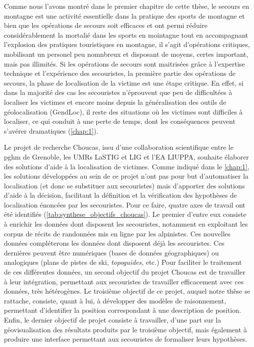 Comme nous l'avons montré dans le premier chapitre de cette thèse, le
secours en montagne est une activité essentielle dans la pratique des
sports de montagne et bien que les opérations de secours soit
efficaces et ont permi réduire considérablement la mortalié dans les
sports en mointagne tout en accompagnant l'explosion des pratiques
touristiques en montagne, il s'agit d'opérations critiques, mobilisant
un personel peu nomnbreux et disposant de moyens, certes important,
mais pas illimités. Si les opérations de secours sont maitrisées grâce
à l'expertise technique et l'expérience des secouristes,
%
la première partie des opérations de secours, \ie la phase de
localisation de la victime est une étape critique. En effet, si dans
la majorité des cas les secouristes n'éprouvent que peu de
difficultées à localiser les victimes et encore moins depuis la
généralisation des outils de géolocalisation (\eg GendLoc), il reste
des situations où les victimes sont difficiles à localiser, ce qui
conduit à une perte de temps, dont les conséquences peuvent s'avérer
dramatiques (\autoref{chap:1}).

Le projet de recherche Choucas, issu d'une collaboration scientifique
entre le \ac{pghm} de Grenoble, les UMRs LaSTIG et LIG et l'EA LIUPPA,
souhaite élaborer des solutions d'aide à la localisation de
victimes. Comme indiqué dans le \autoref{chap:1}, les solutions
développées au sein de ce projet n'ont pas pour but d'automatiser la
localisation (et donc se substituer aux secouristes) mais d'apporter
des solutions d'aide à la décision, facilitant la définition et la
vérification des hypothèses de localisation énoncées par les
secouristes. Pour ce faire, quatre axes de travail ont été identifiés
(\autoref{tab:synthese_objectifs_choucas}). Le premier d'entre eux
consiste à enrichir les données dont disposent les secouristes,
notamment en exploitant les corpus de récits de randonnées mis en
ligne par les alpinistes. Ces nouvelles données compléterons les
données dont disposent déjà les secouristes. Ces dernières peuvent
être numériques (\eg bases de données géographiques) ou analogiques
(\eg plans de pistes de ski, \emph{topoguides,} etc.)
%
Pour faciliter le traitement de ces différentes données, un second
objectif du projet Choucas est de travailler à leur intégration,
permettant aux secouristes de travailler efficacement avec ces
données, très hétérogènes.
%
Le troisième objectif de ce projet, auquel notre thèse se rattache,
consiste, quant à lui, à développer des modèles de raisonnement,
permettant d'identifier la position correspondant à une description de
position.
%
Enfin, le dernier objectif de projet consiste à travailler, d'une part
sur la géovisualisation des résultats produits par le troisième
objectif, mais également à produire une interface permettant aux
secouristes de formaliser leurs hypothèses.

